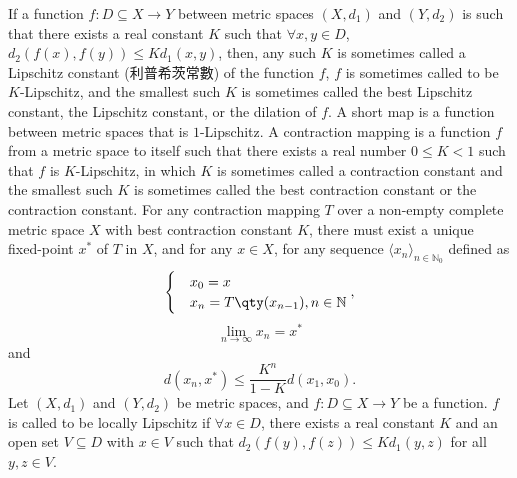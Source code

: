 \documentclass[a4paper,12pt]{report}
\begin{document}
\begin{itemize}
\begin{itemize}
If a function $f\colon D\subseteq X\to Y$ between metric spaces $(X,d_1)$ and $(Y,d_2)$ is such that there exists a real constant $K$ such that $\forall x,y\in D$, $d_{2}(f(x),f(y))\leq Kd_{1}(x,y)$, then, any such $K$ is sometimes called a Lipschitz constant (利普希茨常數) of the function $f$, $f$ is sometimes called to be $K$-Lipschitz, and the smallest such $K$ is sometimes called the best Lipschitz constant, the Lipschitz constant, or the dilation of $f$.
A short map is a function between metric spaces that is $1$-Lipschitz.
A contraction mapping is a function $f$ from a metric space to itself such that there exists a real number $0\leq K<1$ such that $f$ is $K$-Lipschitz, in which $K$ is sometimes called a contraction constant and the smallest such $K$ is sometimes called the best contraction constant or the contraction constant.
For any contraction mapping $T$ over a non-empty complete metric space $X$ with best contraction constant $K$, there must exist a unique fixed-point $x^*$ of $T$ in $X$, and for any $x\in X$, for any sequence $\langle x_n\rangle_{n\in \mathbb {N}_0}$ defined as
\[\begin{cases}
&x_0=x\\
&x_n=T\qty(x_{n-1}),n\in\mathbb{N}
\end{cases},\]
\[\lim_{n\to \infty }x_{n}=x^{*}\]
and
\[d(x_n,x^*)\leq\frac{K^n}{1-K}d(x_1,x_0).\]
Let $(X,d_1)$ and $(Y,d_2)$ be metric spaces, and $f\colon D\subseteq X\to Y$ be a function. $f$ is called to be locally Lipschitz if $\forall x\in D$, there exists a real constant $K$ and an open set $V\subseteq D$ with $x\in V$ such that $d_{2}(f(y),f(z))\leq Kd_{1}(y,z)$ for all $y,z\in V$.


\end{itemize}
\end{itemize}
\end{document}

